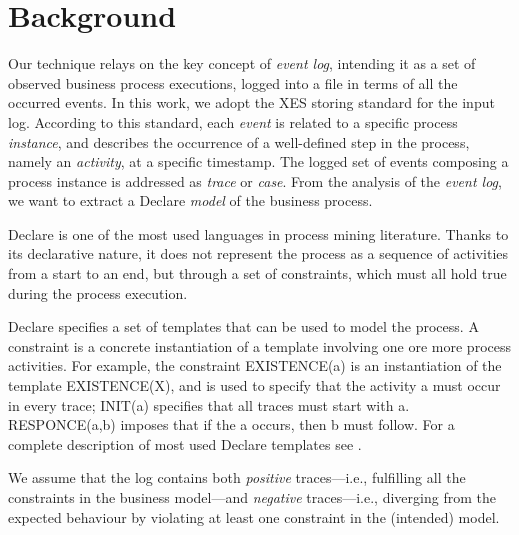 \section{Background}%
\label{sec:back}

Our technique relays on the key concept of \emph{event log}, intending it as a set of observed business process executions, logged into a file in terms of all the occurred events. In this work, we adopt the \ac{XES} storing standard \cite{XES} for the input log. According to this standard, each \emph{event} is related to a specific process \emph{instance}, and describes the occurrence of a well-defined step in the process, namely an \emph{activity}, at a specific timestamp. The logged set of events composing a process instance is addressed as \emph{trace} or \emph{case}. 
From the analysis of the \emph{event log}, we want to extract a Declare \cite{2008-Pesic,2009-Aalst} \emph{model} %
of the business process. %

Declare is one of the most used languages in process mining literature. Thanks to its declarative nature, it does not represent the process as a sequence of activities from a start to an end, but through a set of constraints, which must all hold true during the process execution.

Declare specifies a set of templates that can be used to model the process. 
A constraint is a concrete instantiation of a template involving one ore more process activities.
For example, the constraint \textsf{EXISTENCE(a)} is an instantiation of the template \textsf{EXISTENCE(X)}, and is used to specify that the activity \textsf{a} must occur in every trace; \textsf{INIT(a)} specifies that all traces must start with \textsf{a}. \textsf{RESPONCE(a,b)} imposes that if the \textsf{a} occurs, then \textsf{b} must follow. %
For a complete description of most used Declare templates see \cite{2008-Pesic}. 

We assume that the log contains both \emph{positive} traces---i.e., fulfilling all the constraints in the business model---and \emph{negative} traces---i.e., diverging from the expected behaviour by violating at least one constraint in the (intended) model. 

